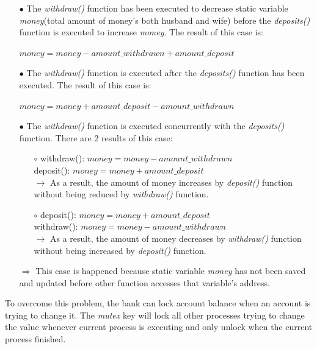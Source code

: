 \documentclass[13pt,a4paper]{article}
\begin{document}
		\begin{itemize}
			\item[$\bullet$] The \textit{withdraw()} function has been executed to decrease static variable \textit{money}(total amount of money's both husband and wife) before the \textit{deposits()} function is executed to increase \textit{money}. The result of this case is:\\
				\centerline{$money = money - amount\_withdrawn + amount\_deposit$}
			\item[$\bullet$] The \textit{withdraw()} function is executed after the \textit{deposits()} function has been executed. The result of this case is:\\
				\centerline{$money = money + amount\_deposit - amount\_withdrawn$}
			\item[$\bullet$] The \textit{withdraw()} function is executed concurrently with the \textit{deposits()} function. There are 2 results of this case:
			\begin{enumerate}
				\item[$\circ$] withdraw(): $money = money - amount\_withdrawn$
							\\ deposit(): $money = money + amount\_deposit$
							\\$\rightarrow$ As a result, the amount of money increases by \textit{deposit()} function without being reduced by \textit{withdraw()} function.
				\item[$\circ$] deposit(): $money = money + amount\_deposit$
							\\ withdraw(): $money = money - amount\_withdrawn$
							\\$\rightarrow$ As a result, the amount of money decreases by
							\textit{withdraw()} function without being increased by \textit{deposit()} function.
			\end{enumerate}
			$\Rightarrow$ This case is happened because static variable \textit{money} has not been saved and updated before other function accesses that variable's address.
		\end{itemize}
		To overcome this problem, the bank can lock account balance when an account is trying to change it. The \textit{mutex} key will lock all other processes trying to change the value whenever current process is executing and only unlock when the current process finished.
\end{document}
